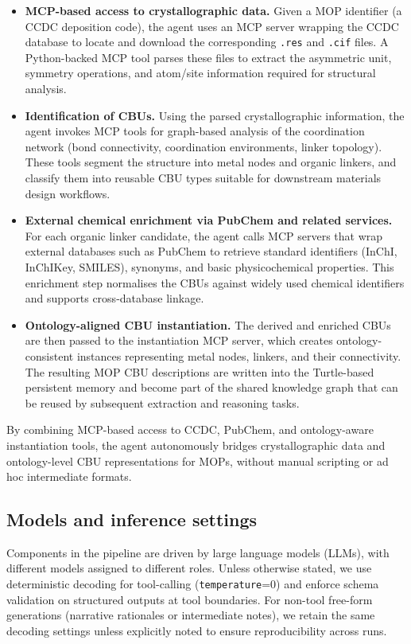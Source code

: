 \begin{itemize}
  \item \textbf{MCP-based access to crystallographic data.} Given a MOP identifier (\eg  a CCDC deposition code), the agent uses an MCP server wrapping the CCDC database to locate and download the corresponding \texttt{.res} and \texttt{.cif} files. A Python-backed MCP tool parses these files to extract the asymmetric unit, symmetry operations, and atom/site information required for structural analysis.

  \item \textbf{Identification of CBUs.} Using the parsed crystallographic information, the agent invokes MCP tools for graph-based analysis of the coordination network (\eg  bond connectivity, coordination environments, linker topology). These tools segment the structure into metal nodes and organic linkers, and classify them into reusable CBU types suitable for downstream materials design workflows.

  \item \textbf{External chemical enrichment via PubChem and related services.} For each organic linker candidate, the agent calls MCP servers that wrap external databases such as PubChem to retrieve standard identifiers (InChI, InChIKey, SMILES), synonyms, and basic physicochemical properties. This enrichment step normalises the CBUs against widely used chemical identifiers and supports cross-database linkage.

  \item \textbf{Ontology-aligned CBU instantiation.} The derived and enriched CBUs are then passed to the instantiation MCP server, which creates ontology-consistent instances representing metal nodes, linkers, and their connectivity. The resulting MOP CBU descriptions are written into the Turtle-based persistent memory and become part of the shared knowledge graph that can be reused by subsequent extraction and reasoning tasks.
\end{itemize}

By combining MCP-based access to CCDC, PubChem, and ontology-aware instantiation tools, the agent autonomously bridges crystallographic data and ontology-level CBU representations for MOPs, without manual scripting or ad hoc intermediate formats.

\subsection{Models and inference settings}\label{sec:models}
Components in the pipeline are driven by large language models (LLMs), with different models assigned to different roles. Unless otherwise stated, we use deterministic decoding for tool-calling (\texttt{temperature}=0) and enforce schema validation on structured outputs at tool boundaries. For non-tool free-form generations (\eg narrative rationales or intermediate notes), we retain the same decoding settings unless explicitly noted to ensure reproducibility across runs.

